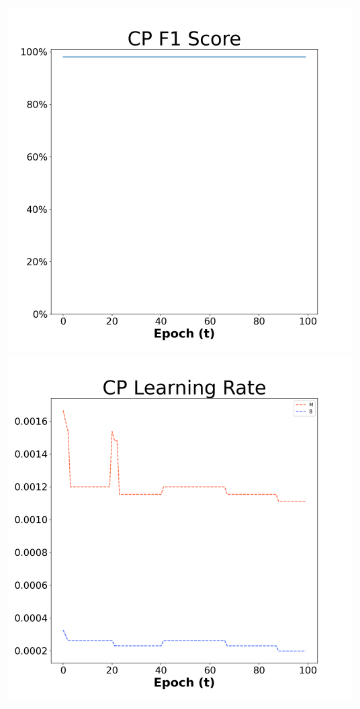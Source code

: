 \begin{figure}[H]
    \centering %
\begin{subfigure}{0.3\textwidth}
  \includegraphics[width=\linewidth]{images/exper2/breast/CP_0.01_f1.png}
    \includegraphics[width=\linewidth]{images/exper2/breast/CP_0.01_lr.png}

\end{subfigure}
\end{figure}
